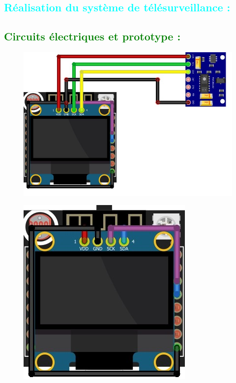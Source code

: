 \begin{flushleft}
	\section{\textcolor{cyan}{Réalisation du système de télésurveillance : }}
	    	\subsection{\textcolor{green}{Circuits électriques et prototype :}}
		    
	    \begin{figure}[h]
	    \centering
	    \includegraphics{chapitres/images/Systeme-de-telesurveillance_bb2.jpg}
		\end{figure}
		\begin{figure}[h]
		\centering
		\includegraphics{chapitres/images/Systeme-de-telesurveillance_bb.jpg}

\end{figure}
\end{flushleft}
